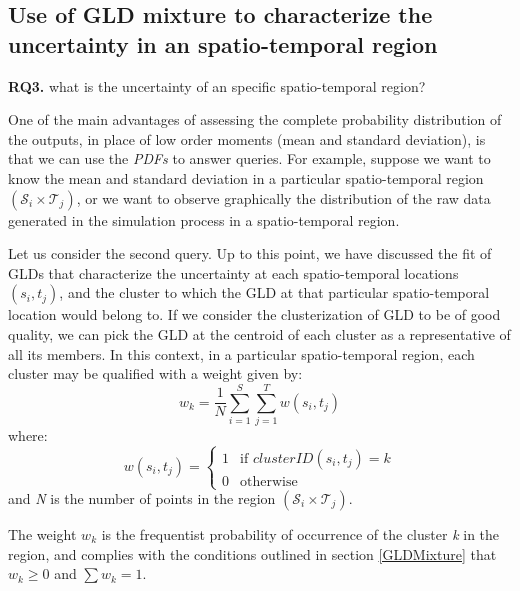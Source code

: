 \subsection{Use of GLD mixture to characterize the uncertainty in an spatio-temporal region}
\label{sub:gldMixtureWorkflow}

\begin{tcolorbox}
\textbf{RQ3.} what is the uncertainty of an specific spatio-temporal region?
\end{tcolorbox}

One of the main advantages of assessing the complete probability distribution of the outputs, in place of low order moments (mean and standard deviation), is that we can use the \textit{PDFs} to answer queries. For example, suppose we want to know the mean and standard deviation in a particular spatio-temporal region $(\mathcal{S}_{i} \times \mathcal{T}_{j})$, or we want to observe graphically the distribution of the raw data generated in the simulation process in a spatio-temporal region. 


Let us consider the second query. Up to this point, we have discussed the fit of GLDs that characterize the uncertainty at each spatio-temporal locations $(s_{i},t_{j})$, and the cluster to which the GLD at that particular spatio-temporal location would belong to. If we consider the clusterization of GLD to be of good quality, we can pick the GLD at the centroid of each cluster as a representative of all its members. In this context, in a particular spatio-temporal region, each cluster may be qualified with a weight given by:
\begin{equation}
w_{k}=\frac{1}{N}\sum_{i=1}^S \sum_{j=1}^T w(s_{i},t_{j})
\end{equation}
where:
\begin{equation}
  w(s_{i},t_{j}) =
  \begin{cases}
    1 & \text{if $clusterID(s_{i},t_{j}) = k$} \\
    0 & \text{otherwise}
  \end{cases}
\end{equation}
and  \textit{N} is the number of points in the region $(\mathcal{S}_{i} \times \mathcal{T}_{j})$.

The weight $w_k$ is the frequentist probability of occurrence of the cluster \textit{k} in the region, and complies with the conditions outlined in section \ref{GLDMixture} that $w_{k} \geq 0$ and $\sum w_{k}=1$.

